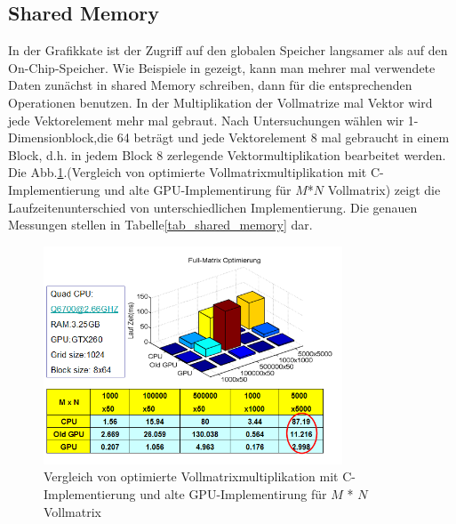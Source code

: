\subsection{Shared Memory}
In der Grafikkate ist der Zugriff auf den globalen Speicher langsamer als auf den On-Chip-Speicher.  Wie Beispiele in \cite{cudapg} gezeigt, kann man mehrer mal verwendete Daten zunächst in shared Memory schreiben, dann für die entsprechenden Operationen benutzen. In der Multiplikation der Vollmatrize mal Vektor wird jede Vektorelement mehr mal gebraut. Nach Untersuchungen wählen wir 1-Dimensionblock,die 64 beträgt und jede Vektorelement 8 mal gebraucht in einem Block, d.h. in jedem Block 8 zerlegende Vektormultiplikation bearbeitet werden. Die Abb.\ref{sharememory}.(Vergleich von optimierte Vollmatrixmultiplikation mit C-Implementierung und alte GPU-Implementirung für $M$*$N$ Vollmatrix) zeigt die Laufzeitenunterschied von unterschiedlichen Implementierung. Die genauen Messungen stellen in Tabelle\ref{tab_shared_memory} dar. 
\begin{figure}[htbp]
\includegraphics[width=3.5in]{../xby/pic/sharememory}
\caption{Vergleich von optimierte Vollmatrixmultiplikation mit C-Implementierung und alte GPU-Implementirung für $M$ * $N$ Vollmatrix}
\label{sharememory}
\end{figure}


